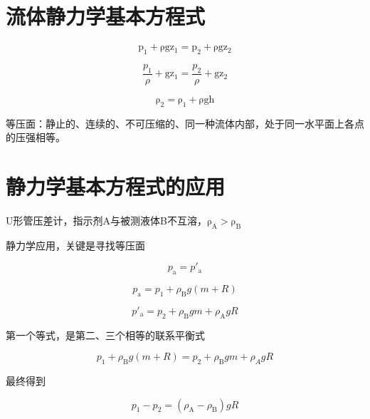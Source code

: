 \documentclass{book}
\begin{document}
\section{流体静力学基本方程式}

\begin{equation}
\mathrm{p_1} + \mathrm{\rho g z_1} = \mathrm{p_2} + \mathrm{\rho g z_2}
\end{equation}

\begin{equation}
\frac{p_1}{\rho} + \mathrm{g z_1} = \frac{p_2}{\rho} + \mathrm{g z_2}
\end{equation}

\begin{equation}
\mathrm{\rho_2} = \mathrm{\rho_1} + \mathrm{\rho gh}
\end{equation}

等压面：静止的、连续的、不可压缩的、同一种流体内部，处于同一水平面上各点的压强相等。

\section{静力学基本方程式的应用}

U形管压差计，指示剂A与被测液体B不互溶，$\mathrm{\rho_A} > \mathrm{\rho_B}$

静力学应用，关键是寻找等压面

\begin{equation}
p_\text{a} = p'_\text{a}
\end{equation}

\begin{equation}
p_\text{a} = p_1 + \rho_\mathrm{B} g (m + R)
\end{equation}

\begin{equation}
p'_\text{a} = p_2 + \rho_\mathrm{B} g m + \rho_\mathrm{A} g R
\end{equation}

第一个等式，是第二、三个相等的联系平衡式

\begin{equation}
p_1 + \rho_\mathrm{B} g (m + R) = p_2 + \rho_\mathrm{B} g m + \rho_A g R
\end{equation}

最终得到

\begin{equation}
p_1 - p_2 = (\rho_\mathrm{A} - \rho_\mathrm{B}) g R
\end{equation}
\end{document}
